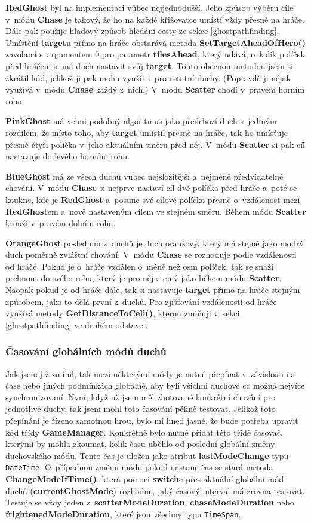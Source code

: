 \documentclass[a4]{article}
\begin{document}
\textbf{RedGhost} byl na implementaci vůbec nejjednodušší. Jeho způsob výběru cíle v~módu \textbf{Chase} je takový, že ho na každé křižovatce umístí vždy přesně na hráče. Dále pak použije hladový způsob hledání cesty ze sekce \ref{ghostpathfinding}. Umístění \textbf{target}u přímo na hráče obstarává metoda \textbf{SetTargetAheadOfHero()} zavolaná s~argumentem 0 pro parametr \textbf{tilesAhead}, který udává, o~kolik políček před hráčem si má duch nastavit svůj \textbf{target}. Touto obecnou metodou jsem si zkrátil kód, jelikož ji pak mohu využít i~pro ostatní duchy. (Popravdě ji nějak využívá v~módu \textbf{Chase} každý z~nich.) V~módu \textbf{Scatter} chodí v~pravém horním rohu.

\textbf{PinkGhost} má velmi podobný algoritmus jako předchozí duch s~jediným rozdílem, že místo toho, aby \textbf{target} umístil přesně na hráče, tak ho umísťuje přesně čtyři políčka v~jeho aktuálním směru před něj. V~módu \textbf{Scatter} si pak cíl nastavuje do levého horního rohu.

\textbf{BlueGhost} má ze všech duchů vůbec nejsložitější a~nejméně předvídatelné chování. V~módu \textbf{Chase} si nejprve nastaví cíl dvě políčka před hráče a~poté se koukne, kde je \textbf{RedGhost} a~posune své cílové políčko přesně o~vzdálenost mezi \textbf{RedGhost}em a~nově nastaveným cílem ve stejném směru. Během módu \textbf{Scatter} krouží v~pravém dolním rohu.

\textbf{OrangeGhost} posledním z~duchů je duch oranžový, který má stejně jako modrý duch poměrně zvláštní chování. V~módu \textbf{Chase} se rozhoduje podle vzdálenosti od hráče. Pokud je o~hráče vzdálen o~méně než osm políček, tak se snaží prchnout do svého rohu, který je pro něj stejný jako během módu \textbf{Scatter}. Naopak pokud je od hráče dále, tak si nastavuje \textbf{target} přímo na hráče stejným způsobem, jako to dělá první z~duchů. Pro zjišťování vzdálenosti od hráče využívá metody \textbf{GetDistanceToCell()}, kterou zmiňuji v~sekci \ref{ghostpathfinding} ve druhém odstavci.

\subsubsection{Časování globálních módů duchů} \label{globalmodetiming}
Jak jsem již zmínil, tak mezi některými módy je nutné přepínat v~závislosti na čase nebo jiných podmínkách globálně, aby byli všichni duchové co možná nejvíce synchronizovaní. Nyní, když už jsem měl zhotovené konkrétní chování pro jednotlivé duchy, tak jsem mohl toto časování pěkně testovat. Jelikož toto přepínání je řízeno samotnou hrou, bylo mi hned jasné, že bude potřeba upravit kód třídy \textbf{GameManager}. Konkrétně bylo nutné přidat této třídě časovač, kterými by mohla zkoumat, kolik času uběhlo od poslední globální změny duchovského módu. Tento čas je uložen jako atribut \textbf{lastModeChange} typu \verb|DateTime|. O~případnou změnu módu pokud nastane čas se stará metoda \textbf{ChangeModeIfTime()}, která pomocí \textbf{switch}e přes aktuální globální mód duchů (\textbf{currentGhostMode}) rozhodne, jaký časový interval má zrovna testovat. Testuje se vždy jeden z~\textbf{scatterModeDuration}, \textbf{chaseModeDuration} nebo \textbf{frightenedModeDuration}, které jsou všechny typu \verb|TimeSpan|. 
\end{document}
